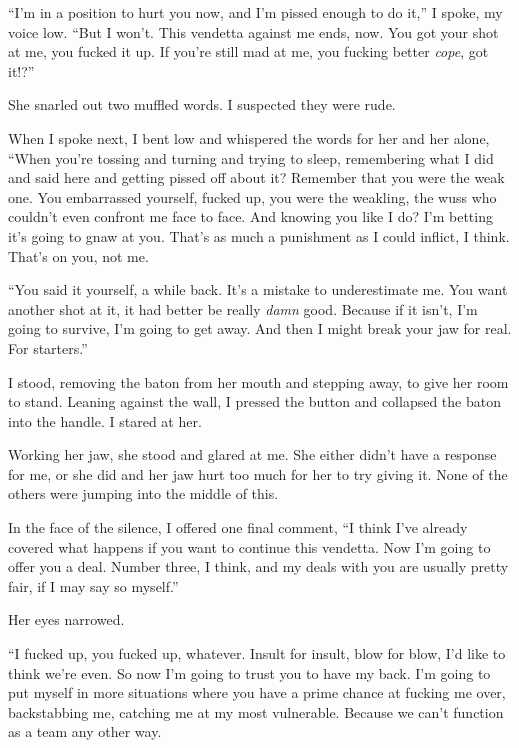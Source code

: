``I'm in a position to hurt you now, and I'm pissed enough to do it,'' I spoke, my voice low.  ``But I won't.  This vendetta against me ends, now.  You got your shot at me, you fucked it up.  If you're still mad at me, you fucking better\emph{ cope}, got it!?''



She snarled out two muffled words.  I suspected they were rude.



When I spoke next, I bent low and whispered the words for her and her alone, ``When you're tossing and turning and trying to sleep, remembering what I did and said here and getting pissed off about it?  Remember that you were the weak one.  You embarrassed yourself, fucked up, you were the weakling, the wuss who couldn't even confront me face to face.  And knowing you like I do?  I'm betting it's going to gnaw at you.  That's as much a punishment as I could inflict, I think.  That's on you, not me.



``You said it yourself, a while back.  It's a mistake to underestimate me.  You want another shot at it, it had better be really \emph{damn} good.  Because if it isn't, I'm going to survive, I'm going to get away.  And then I might break your jaw for real.  For starters.''



I stood, removing the baton from her mouth and stepping away, to give her room to stand.  Leaning against the wall, I pressed the button and collapsed the baton into the handle.  I stared at her.



Working her jaw, she stood and glared at me.  She either didn't have a response for me, or she did and her jaw hurt too much for her to try giving it.  None of the others were jumping into the middle of this.



In the face of the silence, I offered one final comment, ``I think I've already covered what happens if you want to continue this vendetta.  Now I'm going to offer you a deal.  Number three, I think, and my deals with you are usually pretty fair, if I may say so myself.''



Her eyes narrowed.



``I fucked up, you fucked up, whatever.  Insult for insult, blow for blow, I'd like to think we're even.  So now I'm going to trust you to have my back.  I'm going to put myself in more situations where you have a prime chance at fucking me over, backstabbing me, catching me at my most vulnerable.  Because we can't function as a team any other way.



